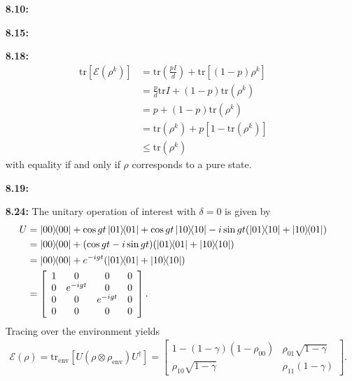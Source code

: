 \documentclass[a4paper,12pt]{article}
\begin{document}
\begin{enumerate}
    \item[\textbf{8.10:}]

    \item[\textbf{8.15:}]

    \item[\textbf{8.18:}]
        \begin{align*}
            \text{tr}[\mathcal{E}(\rho^k)] &= \text{tr} \left( \frac{pI}{d} \right) + \text{tr}[(1 - p)\rho^k] \\
            &= \frac{p}{d} \text{tr}I + (1 - p) \text{tr}(\rho^k) \\
            &= p + (1 - p) \text{tr}(\rho^k) \\
            &= \text{tr}(\rho^k) + p[1 - \text{tr}(\rho^k)] \\
            &\leq \text{tr}(\rho^k)
        \end{align*}
        with equality if and only if $\rho$ corresponds to a pure state.

    \item[\textbf{8.19:}]

    \item[\textbf{8.24:}]
        The unitary operation of interest with $\delta = 0$ is given by
        \begin{align*}
            U &= \dyad{00}{00} + \cos gt \dyad{01}{01} + \cos gt \dyad{10}{10} - i \sin gt(\dyad{01}{10} + \dyad{10}{01}) \\
            &= \dyad{00}{00} + (\cos gt - i\sin gt) (\dyad{01}{01} + \dyad{10}{10}) \\
            &= \dyad{00}{00} + e^{-igt} (\dyad{01}{01} + \dyad{10}{10}) \\
            &= \left[
                \begin{array}{cccc}
                    1 & 0 & 0 & 0 \\
                    0 & e^{-igt} & 0 & 0 \\
                    0 & 0 & e^{-igt} & 0 \\
                    0 & 0 & 0 & 0
                \end{array}
            \right].
        \end{align*}
        Tracing over the environment yields
        \begin{align*}
            \mathcal{E}(\rho) = \text{tr}_{\text{env}} [U (\rho \otimes \rho_{\text{env}}) U^\dagger] = \left[
                \begin{array}{cc}
                    1 - (1 - \gamma)(1 - \rho_{00}) & \rho_{01} \sqrt{1 - \gamma} \\
                    \rho_{10} \sqrt{1 - \gamma} & \rho_{11} (1 - \gamma)
                \end{array}
            \right].
        \end{align*}


\end{enumerate}
\end{document}
